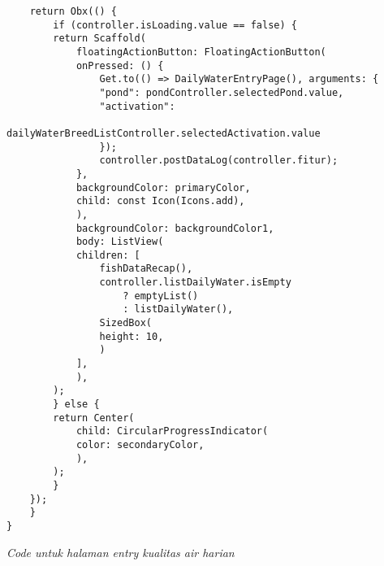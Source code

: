 \begin{lstlisting}
    return Obx(() {
        if (controller.isLoading.value == false) {
        return Scaffold(
            floatingActionButton: FloatingActionButton(
            onPressed: () {
                Get.to(() => DailyWaterEntryPage(), arguments: {
                "pond": pondController.selectedPond.value,
                "activation":
                    dailyWaterBreedListController.selectedActivation.value
                });
                controller.postDataLog(controller.fitur);
            },
            backgroundColor: primaryColor,
            child: const Icon(Icons.add),
            ),
            backgroundColor: backgroundColor1,
            body: ListView(
            children: [
                fishDataRecap(),
                controller.listDailyWater.isEmpty
                    ? emptyList()
                    : listDailyWater(),
                SizedBox(
                height: 10,
                )
            ],
            ),
        );
        } else {
        return Center(
            child: CircularProgressIndicator(
            color: secondaryColor,
            ),
        );
        }
    });
    }
}        
	\end{lstlisting}
	\textit{Code untuk halaman entry kualitas air harian}

